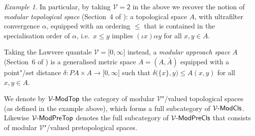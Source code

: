 \documentclass[preprint, a4paper]{elsarticle}
\theoremstyle{definition}
\theoremstyle{remark}
\newtheorem{example}[theorem]{Example}
\providecommand{\brcs}[1]{\lbrace #1 \rbrace}
\providecommand{\brks}[1]{\lbrack #1 \rbrack}
\providecommand{\bigpars}[1]{\bigl(#1\bigr)}
\providecommand{\set}[1]{\brcs{#1}}
\providecommand{\map}[3]{#1\colon#2\to#3}
\providecommand{\catvar}[1]{\mathcal{#1}}
\providecommand{\2}{\mathsf 2}
\providecommand{\V}{\catvar V}
\providecommand{\ModTop}[1]{#1\text-\mathsf{ModTop}}
\providecommand{\ModPreTop}[1]{#1\text-\mathsf{ModPreTop}}
\providecommand{\ModCls}[1]{#1\text-\mathsf{ModCls}}
\providecommand{\ModPreCls}[1]{#1\text-\mathsf{ModPreCls}}
\begin{document}
\begin{example}
		In particular, by taking $\V = \2$ in the above we recover the notion of \emph{modular topological space} (Section~4 of \cite{Tholen09}): a topological space $A$, with ultrafilter convergence $\alpha$, equipped with an ordering $\leq$ that is contained in the specialisation order of $\alpha$, i.e.\ $x \leq y$ implies $(\iota x)\alpha y$ for all $x, y \in A$.
		
		Taking the Lawvere quantale $\V = \brks{0, \infty}$ instead, a \emph{modular approach space} $A$ (Section~6 of \cite{Tholen09}) is a generalised metric space $A = (A, \bar A)$ equipped with a point"/set distance $\map\delta{PA \times A}{\brks{0, \infty}}$ such that $\delta\bigpars{\set x, y} \leq A(x, y)$ for all $x, y \in A$.
	\end{example}
	
	We denote by $\ModTop\V$ the category of modular $\V$"/valued topological spaces (as defined in the example above), which forms a full subcategory of $\ModCls\V$. Likewise $\ModPreTop\V$ denotes the full subcategory of $\ModPreCls\V$ that consists of modular $\V$"/valued pretopological spaces.
\end{document}
